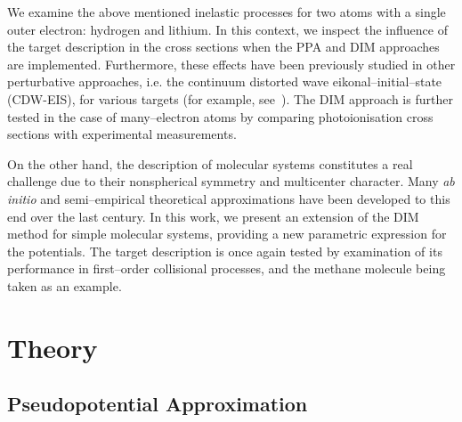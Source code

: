 \documentclass[10pt]{article}
\begin{document}
We examine the above mentioned inelastic processes for two atoms with 
a single outer electron: hydrogen and lithium. In this context, we 
inspect the influence of the target description in the cross sections 
when the PPA and DIM approaches are implemented. Furthermore, these 
effects have been previously studied in other perturbative approaches,
i.e. the continuum distorted wave eikonal--initial--state (CDW-EIS), 
for various targets (for example, see~\cite{Kirchner1998,Fiori2001}).
The DIM approach is further tested in the case of many--electron 
atoms by comparing photoionisation cross sections with experimental 
measurements. 

On the other hand, the description of molecular systems constitutes 
a real challenge due to their nonspherical symmetry and multicenter 
character. Many \textit{ab initio} and semi--empirical theoretical 
approximations \cite{Szabo1996,Helgaker2000,Schaefer2004} have been 
developed to this end over the last century. In this work, we present 
an extension of the DIM method for simple molecular systems, 
providing a new parametric expression for the potentials. The target 
description is once again tested by examination of its performance in 
first--order collisional processes, and the methane molecule being 
taken as an example.


\section{Theory}

\subsection{Pseudopotential Approximation}
\label{sec:PPAs}
\end{document}
